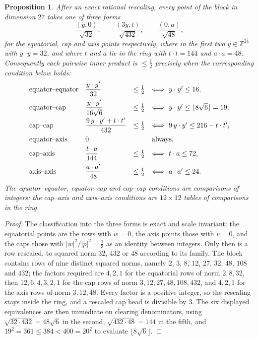 \documentclass[11pt]{amsart}
\newtheorem{proposition}[theorem]{Proposition}
\theoremstyle{remark}
\begin{document}
\begin{proposition}\label{prop:reduction}
After an exact rational rescaling, every point of the block in dimension $27$
takes one of three forms
\[
   \frac{(y,0)}{\sqrt{32}},\qquad
   \frac{(3y,t)}{\sqrt{432}},\qquad
   \frac{(0,a)}{\sqrt{48}},
\]
for the equatorial, cap and axis points respectively, where in the first two
$y\in\mathbb{Z}^{24}$ with $y\cdot y=32$, and where $t$ and $a$ lie in the ring
with $t\cdot t=144$ and $a\cdot a=48$. Consequently each pairwise inner product
is $\le\tfrac12$ precisely when the corresponding condition below holds:
\[
\begin{array}{lll@{\quad}l}
   \text{equator--equator} & \dfrac{y\cdot y'}{32}
      &\le\tfrac12 &\Longleftrightarrow\ y\cdot y'\le16,\\[8pt]
   \text{equator--cap}     & \dfrac{y\cdot y'}{16\sqrt6}
      &\le\tfrac12 &\Longleftrightarrow\ y\cdot y'\le\lfloor8\sqrt6\rfloor=19,\\[8pt]
   \text{cap--cap}         & \dfrac{9\,y\cdot y'+t\cdot t'}{432}
      &\le\tfrac12 &\Longleftrightarrow\ 9\,y\cdot y'\le216-t\cdot t',\\[8pt]
   \text{equator--axis}    & 0 && \text{always},\\[4pt]
   \text{cap--axis}        & \dfrac{t\cdot a}{144}
      &\le\tfrac12 &\Longleftrightarrow\ t\cdot a\le72,\\[8pt]
   \text{axis--axis}       & \dfrac{a\cdot a'}{48}
      &\le\tfrac12 &\Longleftrightarrow\ a\cdot a'\le24.
\end{array}
\]
The equator--equator, equator--cap and cap--cap conditions are comparisons of
integers; the cap--axis and axis--axis conditions are $12\times12$ tables of
comparisons in the ring.
\end{proposition}

\begin{proof}
The classification into the three forms is exact and scale invariant: the
equatorial points are the rows with $w=0$, the axis points those with $v=0$, and
the caps those with $|w|^{2}/|p|^{2}=\tfrac13$ as an identity between integers.
Only then is a row rescaled, to squared norm $32$, $432$ or $48$ according to its
family. The block contains rows of nine distinct squared norms, namely $2$, $3$,
$8$, $12$, $27$, $32$, $48$, $108$ and $432$; the factors required are
$4,2,1$ for the equatorial rows of norm $2,8,32$, then $12,6,4,3,2,1$ for the
cap rows of norm $3,12,27,48,108,432$, and $4,2,1$ for the axis rows of norm
$3,12,48$. Every factor is a positive integer, so the rescaling stays inside the
ring, and a rescaled cap head is divisible by $3$. The six displayed equivalences are
then immediate on clearing denominators, using $\sqrt{32\cdot432}=48\sqrt6$ in
the second, $\sqrt{432\cdot48}=144$ in the fifth, and
$19^{2}=361\le384<400=20^{2}$ to evaluate $\lfloor8\sqrt6\rfloor$.
\end{proof}
\end{document}
